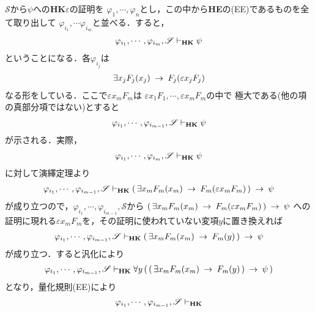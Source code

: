 	\begin{sketch}
		$\mathscr{S}$から$\psi$への{\bf HK$\varepsilon$}の証明を
		$\varphi_{1},\cdots,\varphi_{n}$とし，この中から{\bf HE}の(EE)であるものを全て取り出して
		$\varphi_{i_{1}},\cdots\varphi_{i_{m}}$と並べる．すると，
		\begin{align}
			\varphi_{i_{1}},\cdots,\varphi_{i_{m}},\mathscr{S} 
			\vdash_{{\scriptsize \mbox{{\bf HK}}}} \psi
		\end{align}
		ということになる．各$\varphi_{i_{j}}$は
		\begin{align}
			\exists x_{j} F_{j}(x_{j}) \hspace{0.25em}\rightarrow\hspace{0.25em} F_{j}(\varepsilon x_{j} F_{j})
		\end{align}
		なる形をしている．ここで$\varepsilon x_{m} F_{m}$は
		$\varepsilon x_{1} F_{1},\cdots,\varepsilon x_{m} F_{m}$の中で
		極大である(他の項の真部分項ではない)とすると
		\begin{align}
			\varphi_{i_{1}},\cdots,\varphi_{i_{m-1}},\mathscr{S} 
			\vdash_{{\scriptsize \mbox{{\bf HK}}}} \psi
		\end{align}
		が示される．実際，
		\begin{align}
			\varphi_{i_{1}},\cdots,\varphi_{i_{m}},\mathscr{S} 
			\vdash_{{\scriptsize \mbox{{\bf HK}}}} \psi
		\end{align}
		に対して演繹定理より
		\begin{align}
			\varphi_{i_{1}},\cdots,\varphi_{i_{m-1}},\mathscr{S} 
			\vdash_{{\scriptsize \mbox{{\bf HK}}}} 
			(\, \exists x_{m} F_{m}(x_{m}) \hspace{0.25em}\rightarrow\hspace{0.25em} F_{m}(\varepsilon x_{m} F_{m})\, ) \hspace{0.25em}\rightarrow\hspace{0.25em} \psi
		\end{align}
		が成り立つので，$\varphi_{i_{1}},\cdots,\varphi_{i_{m-1}},\mathscr{S}$から
		$(\, \exists x_{m} F_{m}(x_{m}) \hspace{0.25em}\rightarrow\hspace{0.25em} F_{m}(\varepsilon x_{m} F_{m})\, ) \hspace{0.25em}\rightarrow\hspace{0.25em} \psi$
		への証明に現れる$\varepsilon x_{m} F_{m}$を，その証明に使われていない変項$y$に置き換えれば
		\begin{align}
			\varphi_{i_{1}},\cdots,\varphi_{i_{m-1}},\mathscr{S} 
			\vdash_{{\scriptsize \mbox{{\bf HK}}}} 
			(\, \exists x_{m} F_{m}(x_{m}) \hspace{0.25em}\rightarrow\hspace{0.25em} F_{m}(y)\, ) \hspace{0.25em}\rightarrow\hspace{0.25em} \psi
		\end{align}
		が成り立つ．すると汎化により
		\begin{align}
			\varphi_{i_{1}},\cdots,\varphi_{i_{m-1}},\mathscr{S} 
			\vdash_{{\scriptsize \mbox{{\bf HK}}}} 
			\forall y\, (\, (\, \exists x_{m} F_{m}(x_{m}) \hspace{0.25em}\rightarrow\hspace{0.25em} F_{m}(y)\, ) \hspace{0.25em}\rightarrow\hspace{0.25em} \psi\, )
		\end{align}
		となり，量化規則(EE)により
		\begin{align}
			\varphi_{i_{1}},\cdots,\varphi_{i_{m-1}},\mathscr{S} 
			\provable{\mbox{{\bf HK}}} 

\end{align}
\end{sketch}
